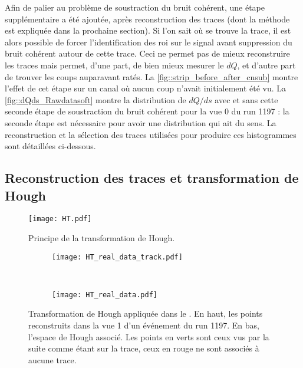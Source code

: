       Afin de palier au problème de soustraction du bruit cohérent, une étape supplémentaire a été ajoutée, après reconstruction des traces (dont la méthode est expliquée dans la prochaine section). Si l'on sait où se trouve la trace, il est alors possible de forcer l'identification des \gls{roi} sur le signal avant suppression du bruit cohérent autour de cette trace. Ceci ne permet pas de mieux reconstruire les traces mais permet, d'une part, de bien mieux mesurer le $dQ$, et d'autre part de trouver les coups auparavant ratés. La \autoref{fig::strip_before_after_cnsub} montre l'effet de cet étape sur un canal où aucun coup n'avait initialement été vu. La \autoref{fig::dQds_Rawdatasoft} montre la distribution de $dQ/ds$ avec et sans cette seconde étape de soustraction du bruit cohérent pour la vue 0 du run 1197 : la seconde étape est nécessaire pour avoir une distribution qui ait du sens. La reconstruction et la sélection des traces utilisées pour produire ces histogrammes sont détaillées ci-dessous.

    \subsection{Reconstruction des traces et transformation de Hough}

      \begin{figure}[htbp]
        \centering
        \texttt{[image: HT.pdf]}
        \caption[Transformation de Hough]{\label{fig::HoughTransformation}Principe de la transformation de Hough.}
      \end{figure}

      \begin{figure}[htbp]
        \centering
        \begin{subfigure}[t]{0.8\textwidth}
          \centering
          \texttt{[image: HT\_real\_data\_track.pdf]}
        \end{subfigure}\\
        \begin{subfigure}[t]{0.48\textwidth}
          \centering
          \texttt{[image: HT\_real\_data.pdf]}
        \end{subfigure}
        \caption[Transformation de Hough dans le \TOO{}.]{\label{fig::HT_real_data}Transformation de Hough appliquée dans le \TOO{}. En haut, les points reconstruits dans la vue 1 d'un événement du run 1197. En bas, l'espace de Hough associé. Les points en verts sont ceux vus par la suite comme étant sur la trace, ceux en rouge ne sont associés à aucune trace.}
      \end{figure}

